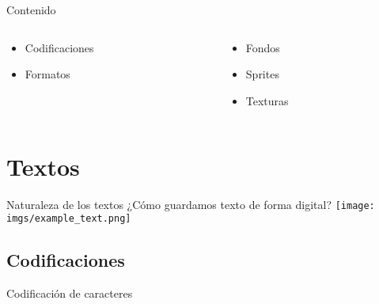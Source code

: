 \begin{frame}{Contenido}
    \begin{columns}
    \begin{column}{0.5\textwidth}
        \begin{itemize}
            \item<2-> Codificaciones
            \item<2-> Formatos
        \end{itemize}
    \end{column}
    \hfill
    \begin{column}{0.5\textwidth}
        \begin{itemize}
            \item<3-> Fondos
            \item<3-> Sprites
            \item<3-> Texturas
        \end{itemize}
        \vfill{}
    \end{column}
    \end{columns}
\end{frame}

\section{Textos}
\begin{frame}{Naturaleza de los textos}
    \centering\Large ¿Cómo guardamos texto de forma digital?
    \texttt{[image: imgs/example\_text.png]}
\end{frame}

\subsection{Codificaciones}
\begin{frame}{Codificación de caracteres}
    \centering
\end{frame}

